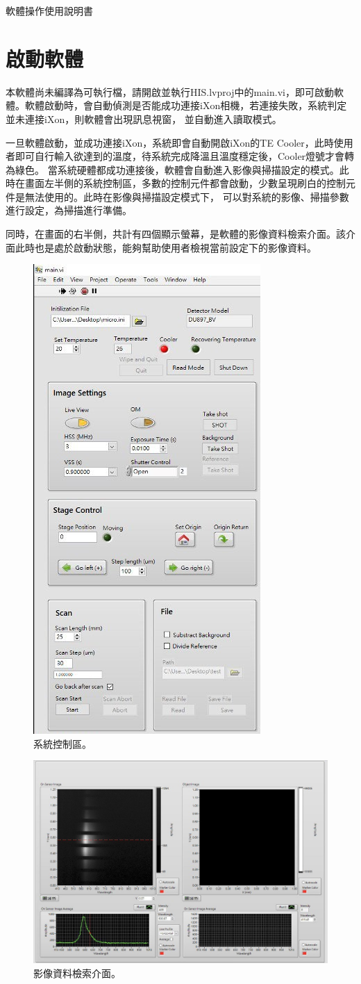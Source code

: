 \documentclass[12pt]{article}
\begin{document}
    \thispagestyle{empty}\null\vspace{5cm}\newline
    {\large 軟體操作使用說明書}\newpage
    \tableofcontents\newpage
    \section{啟動軟體}
    本軟體尚未編譯為可執行檔，請開啟並執行HIS.lvproj中的main.vi，即可啟動軟體。軟體啟動時，會自動偵測是否能成功連接iXon相機，若連接失敗，系統判定並未連接iXon，則軟體會出現訊息視窗，
    並自動進入讀取模式。
    
    一旦軟體啟動，並成功連接iXon，系統即會自動開啟iXon的TE Cooler，此時使用者即可自行輸入欲達到的溫度，待系統完成降溫且溫度穩定後，Cooler燈號才會轉為綠色。
    當系統硬體都成功連接後，軟體會自動進入影像與掃描設定的模式。此時在畫面左半側的系統控制區，多數的控制元件都會啟動，少數呈現刷白的控制元件是無法使用的。此時在影像與掃描設定模式下，
    可以對系統的影像、掃描參數進行設定，為掃描進行準備。

    同時，在畫面的右半側，共計有四個顯示螢幕，是軟體的影像資料檢索介面。該介面此時也是處於啟動狀態，能夠幫助使用者檢視當前設定下的影像資料。
    \begin{figure}[h]
        \centering
        \includegraphics[width=0.33\linewidth]{settingPanel.jpeg}
        \caption{系統控制區。}
    \end{figure}
    \begin{figure}[h]
        \centering
        \includegraphics[width=0.75\linewidth]{browsePanel.jpeg}
        \caption{影像資料檢索介面。}
    \end{figure}
\end{document}
